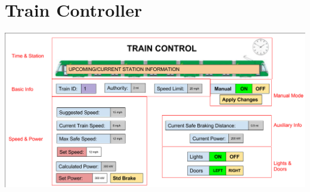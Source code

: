 \documentclass{scrreprt}
\begin{document}
\chapter{Train Controller}
\includegraphics[width=\textwidth]{tc}
\end{document}
